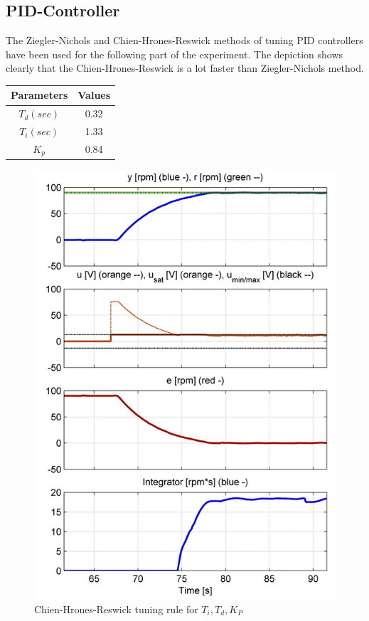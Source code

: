 \subsection{PID-Controller}
The Ziegler-Nichols and Chien-Hrones-Reswick methods of tuning PID controllers have been used for the following part of the experiment. The depiction shows clearly that the Chien-Hrones-Reswick is a lot faster than Ziegler-Nichols method.
\begin{center}
\begin{tabular}{ |c|c| } 
 \hline
 Parameters & Values \\ \hline
 $T_{d}(sec)$ & 0.32   \\  
 \hline
 $T_{i}(sec)$ & 1.33  \\ \hline
 $K_{p}$ & 0.84 \\ \hline
\end{tabular}
\end{center}

\begin{figure}[H]
\begin{center}
\includegraphics[width=0.6\linewidth]{images/general//PID/Ziegler_nichols}
\end{center}
\caption{  Chien-Hrones-Reswick tuning rule for $T_{i}, T_{d},K_{P}$ }
\label{fig:Ziegler_nichols}
\end{figure}


